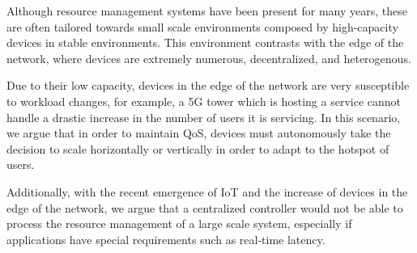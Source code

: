 Although resource management systems have been present for many years, these are often tailored towards small scale environments composed by high-capacity devices in stable environments. This environment contrasts with the edge of the network, where devices are extremely numerous, decentralized, and heterogenous.

Due to their low capacity, devices in the edge of the network are very susceptible to workload changes, for example, a 5G tower which is hosting a service cannot handle a drastic increase in the number of users it is servicing. In this scenario, we argue that in order to maintain QoS, devices must autonomously take the decision to scale horizontally or vertically in order to adapt to the hotspot of users.

Additionally, with the recent emergence of IoT and the increase of devices in the edge of the network, we argue that a centralized controller would not be able to process the resource management of a large scale system, especially if applications have special requirements such as real-time latency.







